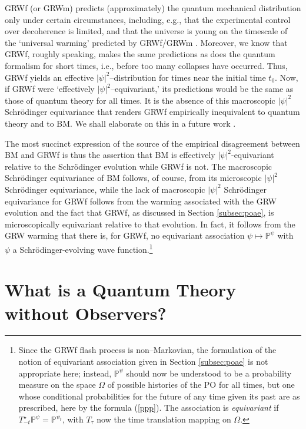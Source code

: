 \documentclass[12pt]{article}
\newcommand{\PPP}{\mathbb{P}}
\begin{document}
{\sf GRWf} (or {\sf GRWm}) predicts (approximately) the quantum mechanical
distribution only under certain circumstances, including, e.g., that the
experimental control over decoherence is limited, and that the universe is
young on the timescale of the `universal warming' predicted by {\sf
  GRWf}/{\sf GRWm} \citep[see][for details]{BG03}. Moreover, we know that
{\sf GRWf}, roughly speaking, makes the same predictions as does the
quantum formalism for short times, i.e., before too many collapses have
occurred. Thus, {\sf GRWf} yields an effective $|\psi|^2$--distribution for
times near the initial time $t_0$.  Now, if {\sf GRWf} were `effectively
$|\psi|^2$--equivariant,' its predictions would be the same as those of
quantum theory for all times. It is the absence of this macroscopic
$|\psi|^2$ Schr\"odinger equivariance that renders {\sf GRWf} empirically
inequivalent to quantum theory and to {\sf BM}. We shall elaborate on this
in a future work \citep{EEE}.

The most succinct expression of the source of the empirical disagreement
between {\sf BM} and {\sf GRWf} is thus the assertion that {\sf BM} is
effectively $|\psi|^2$-equivariant relative to the Schr\"odinger evolution
while {\sf GRWf} is not.  The macroscopic Schr\"odinger equivariance of
{\sf BM} follows, of course, from its microscopic $|\psi|^2$
Schr\"o\-din\-ger equivariance, while the lack of macroscopic $|\psi|^2$
Schr\"odinger equivariance for {\sf GRWf} follows from the warming
associated with the {\sf GRW} evolution and the fact that {\sf GRWf}, as
discussed in Section \ref{subsec:poae}, is microscopically equivariant
relative to that evolution. In fact, it follows from the {\sf GRW} warming
that there is, for {\sf GRWf}, no equivariant association $\psi \mapsto
\PPP^{\psi}$ with $\psi$ a Schr\"odinger-evolving wave
function.\footnote{Since the {\sf GRWf} flash process is non--Markovian, the
formulation of the notion of equivariant association given in Section
\ref{subsec:poae} is not appropriate here; instead, $\PPP^{\psi}$ should
now be understood to be a probability measure on the space $\Omega$ of
possible histories of the PO for all times, but one whose conditional
probabilities for the future of any time given its past are as prescribed,
here by the formula (\ref{ppp}). The association is \textit{equivariant} if
$T_{-t}^{\star}\PPP^{\psi}=\PPP^{\psi_t}$, with $T_\tau$ now the time
translation mapping on $\Omega$.}



\section{What is a Quantum Theory without Observers?}
\label{sec:essential}
\end{document}
